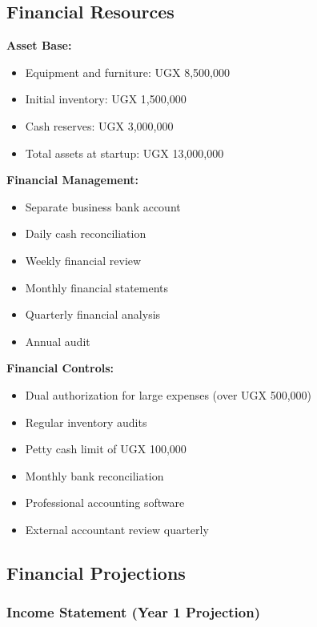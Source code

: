 \subsection{Financial Resources}

\textbf{Asset Base:}
\begin{itemize}[leftmargin=2em]
    \item Equipment and furniture: UGX 8,500,000
    \item Initial inventory: UGX 1,500,000
    \item Cash reserves: UGX 3,000,000
    \item Total assets at startup: UGX 13,000,000
\end{itemize}

\textbf{Financial Management:}
\begin{itemize}[leftmargin=2em]
    \item Separate business bank account
    \item Daily cash reconciliation
    \item Weekly financial review
    \item Monthly financial statements
    \item Quarterly financial analysis
    \item Annual audit
\end{itemize}

\textbf{Financial Controls:}
\begin{itemize}[leftmargin=2em]
    \item Dual authorization for large expenses (over UGX 500,000)
    \item Regular inventory audits
    \item Petty cash limit of UGX 100,000
    \item Monthly bank reconciliation
    \item Professional accounting software
    \item External accountant review quarterly
\end{itemize}

\subsection{Financial Projections}

\subsubsection{Income Statement (Year 1 Projection)}

